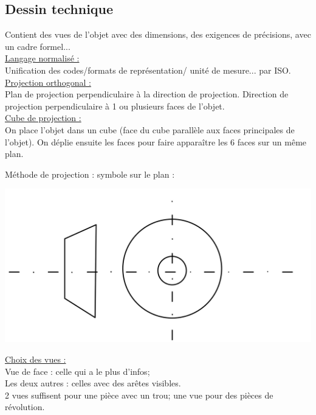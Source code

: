 \documentclass[../main.tex]{subfiles}
\begin{document}
\localtableofcontents
\subsection{Dessin technique}
Contient des vues de l'objet avec des dimensions, des exigences de précisions, avec un cadre formel...\\

\quad \underline{Langage normalisé :}\\
Unification des codes/formats de représentation/ unité de mesure... par ISO.\\

\quad \underline{Projection orthogonal :}\\
Plan de projection perpendiculaire à la direction de projection. Direction de projection perpendiculaire à 1 ou plusieurs faces de l'objet.\\

\quad \underline{Cube de projection :}\\
On place l'objet dans un cube (face du cube parallèle aux faces principales de l'objet). On déplie ensuite les faces pour faire apparaître les 6 faces sur un même plan.\\
\begin{minipage}{.5\textwidth}
    Méthode de projection : symbole sur le plan :
\end{minipage}
\hfill
\begin{minipage}{.5\textwidth}
    \includegraphics[width=\textwidth]{IMAGES/constru/symboleiso.jpeg}
\end{minipage}

\quad \underline{Choix des vues :}\\
Vue de face : celle qui a le plus d'infos;\\
Les deux autres : celles avec des arêtes visibles.\\
\color{gray} 2 vues suffisent pour une pièce avec un trou; une vue pour des pièces de révolution.\color{black}\\
\end{document}
